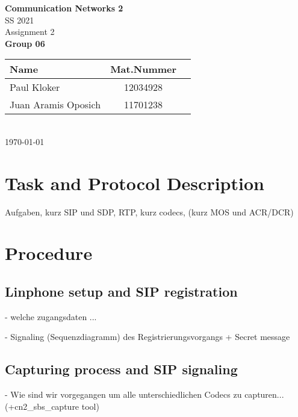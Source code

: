 \documentclass[parskip=full]{scrartcl}
\begin{document}
\begin{titlepage}
    \centering
    \vspace*{2cm}
    {\Huge \textbf{Communication Networks 2}}\\
    SS 2021\\
    \vspace*{1cm}
    {\Large Assignment 2}
    \\\vspace*{3cm}
    {\Large \textbf{Group 06}}\\
    \vspace*{1cm}
    {\large 
        \begin{tabular}{l c c}
            Name & Mat.Nummer \\ \hline
            Paul Kloker & 12034928 \\
            Juan Aramis Oposich & 11701238
        \end{tabular}
    }
    \\\vspace*{7cm}
    \today
\end{titlepage}

\section{Task and Protocol Description} \label{sec:task}
Aufgaben, kurz SIP und SDP, RTP, kurz codecs, (kurz MOS und ACR/DCR)
\section{Procedure} \label{sec:procedure}

\subsection{Linphone setup and SIP registration} \label{subsec:setup}
- welche zugangsdaten ... 

- Signaling (Sequenzdiagramm) des Registrierungsvorgangs + Secret message 
\subsection{Capturing process and SIP signaling} \label{subsec:capture}
- Wie sind wir vorgegangen um alle unterschiedlichen Codecs zu capturen... (+cn2\_sbs\_capture  tool)
\end{document}
